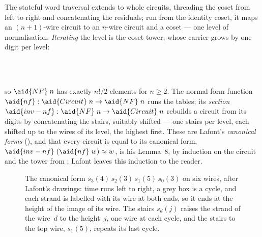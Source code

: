 The stateful word traversal  extends  to whole circuits, threading the coset from left to right and concatenating the residuals; run from the identity coset, it maps an $(n{+}1)$-wire circuit to an $n$-wire circuit and a coset --- one level of normalisation. \emph{Iterating} the level is the coset tower, whose carrier grows by one digit per level:
\begin{code}%
\>[0]\AgdaSpace{}%
\AgdaSymbol{:}\AgdaSpace{}%
\AgdaSpace{}%
\AgdaSpace{}%
\<%
\\
\>[0]\AgdaSpace{}%
%
\>[10]\AgdaSymbol{=}\AgdaSpace{}%
\<%
\\
\>[0]\AgdaSpace{}%
\AgdaSymbol{(}\AgdaSpace{}%
\AgdaSymbol{)}\AgdaSpace{}%
\AgdaSymbol{=}\AgdaSpace{}%
\AgdaSpace{}%
\AgdaSpace{}%
\AgdaSpace{}%
\AgdaSpace{}%
%
\>[25]\<%
\end{code}
so $\aid{NF}\;n$ has exactly $n!/2$ elements for $n \ge 2$. The normal-form function $\aid{nf} : \aid{Circuit}\;n \to \aid{NF}\;n$ runs the tables; its \emph{section} $\aid{inv-nf} : \aid{NF}\;n \to \aid{Circuit}\;n$ rebuilds a circuit from its digits by concatenating the stairs, suitably shifted --- one stairs per level, each shifted up to the wires of its level, the highest first. These are Lafont's \emph{canonical forms} (), and that every circuit is equal to its canonical form, $\aid{inv-nf}\;(\aid{nf}\;w) \approx w$, is his Lemma~8, by induction on the circuit and the tower from ; Lafont leaves this induction to the reader.

\begin{figure}[!htbp]
\centering
\small

\caption{The canonical form $s_3(4)\,s_2(3)\,s_1(5)\,s_0(3)$ on six wires, after Lafont's drawings: time runs left to right, a grey box is a cycle, and each strand is labelled with its wire at both ends, so it ends at the height of the image of its wire. The stairs $s_d(j)$ raises the strand of the wire~$d$ to the height~$j$, one wire at each cycle, and the stairs to the top wire, $s_1(5)$, repeats its last cycle.}
\label{fig:lafont}
\end{figure}

